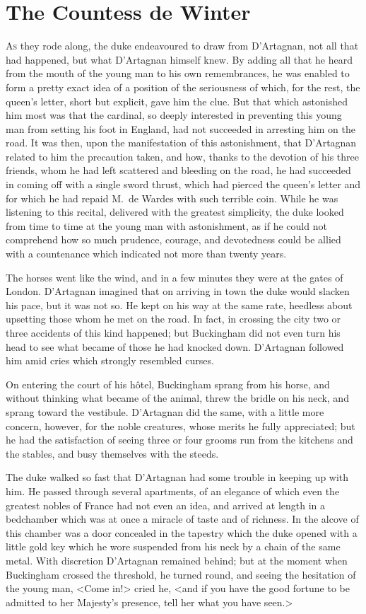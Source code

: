 
\chapter{The Countess de Winter}

\lettrine{A}{s} they rode along, the duke endeavoured to draw from D'Artagnan, not all that had happened, but what D'Artagnan himself knew. By adding all that he heard from the mouth of the young man to his own remembrances, he was enabled to form a pretty exact idea of a position of the seriousness of which, for the rest, the queen's letter, short but explicit, gave him the clue. But that which astonished him most was that the cardinal, so deeply interested in preventing this young man from setting his foot in England, had not succeeded in arresting him on the road. It was then, upon the manifestation of this astonishment, that D'Artagnan related to him the precaution taken, and how, thanks to the devotion of his three friends, whom he had left scattered and bleeding on the road, he had succeeded in coming off with a single sword thrust, which had pierced the queen's letter and for which he had repaid M.~de Wardes with such terrible coin. While he was listening to this recital, delivered with the greatest simplicity, the duke looked from time to time at the young man with astonishment, as if he could not comprehend how so much prudence, courage, and devotedness could be allied with a countenance which indicated not more than twenty years. 

The horses went like the wind, and in a few minutes they were at the gates of London. D'Artagnan imagined that on arriving in town the duke would slacken his pace, but it was not so. He kept on his way at the same rate, heedless about upsetting those whom he met on the road. In fact, in crossing the city two or three accidents of this kind happened; but Buckingham did not even turn his head to see what became of those he had knocked down. D'Artagnan followed him amid cries which strongly resembled curses. 

On entering the court of his hôtel, Buckingham sprang from his horse, and without thinking what became of the animal, threw the bridle on his neck, and sprang toward the vestibule. D'Artagnan did the same, with a little more concern, however, for the noble creatures, whose merits he fully appreciated; but he had the satisfaction of seeing three or four grooms run from the kitchens and the stables, and busy themselves with the steeds. 

The duke walked so fast that D'Artagnan had some trouble in keeping up with him. He passed through several apartments, of an elegance of which even the greatest nobles of France had not even an idea, and arrived at length in a bedchamber which was at once a miracle of taste and of richness. In the alcove of this chamber was a door concealed in the tapestry which the duke opened with a little gold key which he wore suspended from his neck by a chain of the same metal. With discretion D'Artagnan remained behind; but at the moment when Buckingham crossed the threshold, he turned round, and seeing the hesitation of the young man, <Come in!> cried he, <and if you have the good fortune to be admitted to her Majesty's presence, tell her what you have seen.> 

